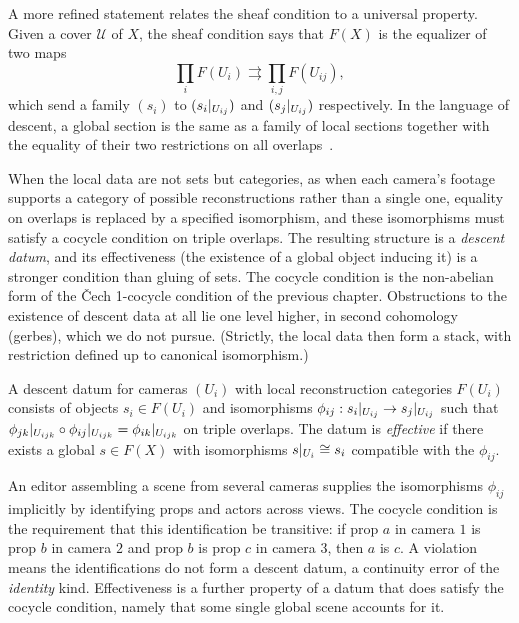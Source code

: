 A more refined statement relates the sheaf condition to a universal property. Given a cover $\mathcal{U}$ of $X$, the sheaf condition says that $F(X)$ is the equalizer of two maps
\[
\prod_iF(U_i)\rightrightarrows\prod_{i,j}F(U_{ij}),
\]
which send a family $(s_i)$ to $(s_i|_{U_{ij}})$ and $(s_j|_{U_{ij}})$ respectively. In the language of descent, a global section is the same as a family of local sections together with the equality of their two restrictions on all overlaps~\cite{maclane1992}.

When the local data are not sets but categories, as when each camera's footage supports a category of possible reconstructions rather than a single one, equality on overlaps is replaced by a specified isomorphism, and these isomorphisms must satisfy a cocycle condition on triple overlaps. The resulting structure is a \emph{descent datum}, and its effectiveness (the existence of a global object inducing it) is a stronger condition than gluing of sets. The cocycle condition is the non-abelian form of the \v{C}ech 1-cocycle condition of the previous chapter. Obstructions to the existence of descent data at all lie one level higher, in second cohomology (gerbes), which we do not pursue. (Strictly, the local data then form a stack, with restriction defined up to canonical isomorphism.)

\begin{definition}
A descent datum for cameras $(U_i)$ with local reconstruction categories $F(U_i)$ consists of objects $s_i\in F(U_i)$ and isomorphisms $\phi_{ij}:s_i|_{U_{ij}}\to s_j|_{U_{ij}}$ such that $\phi_{jk}|_{U_{ijk}}\circ\phi_{ij}|_{U_{ijk}}=\phi_{ik}|_{U_{ijk}}$ on triple overlaps. The datum is \emph{effective} if there exists a global $s\in F(X)$ with isomorphisms $s|_{U_i}\cong s_i$ compatible with the $\phi_{ij}$.
\end{definition}

An editor assembling a scene from several cameras supplies the isomorphisms $\phi_{ij}$ implicitly by identifying props and actors across views. The cocycle condition is the requirement that this identification be transitive: if prop $a$ in camera $1$ is prop $b$ in camera $2$ and prop $b$ is prop $c$ in camera $3$, then $a$ is $c$. A violation means the identifications do not form a descent datum, a continuity error of the \emph{identity} kind. Effectiveness is a further property of a datum that does satisfy the cocycle condition, namely that some single global scene accounts for it.


